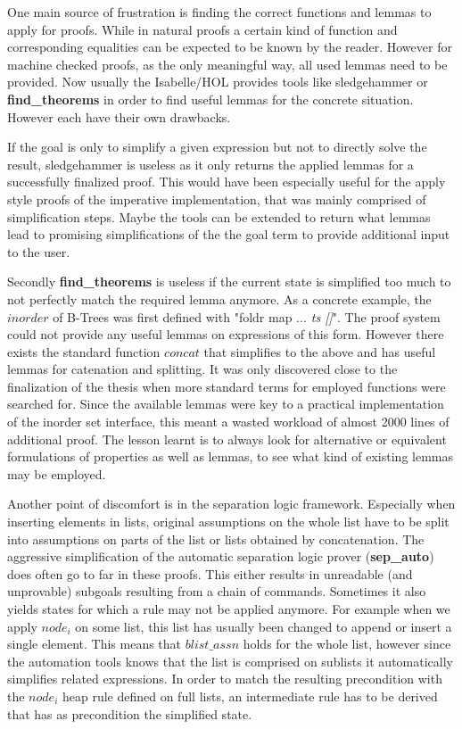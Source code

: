 One main source of frustration is finding the correct
functions and lemmas to apply for proofs.
While in natural proofs a certain kind of function and corresponding equalities can be
expected to be known by the reader.
However for machine checked proofs, as the only meaningful way,
all used lemmas need to be provided.
Now usually the Isabelle/HOL provides tools like sledgehammer
or \textbf{find\_theorems} in order to find useful lemmas for the concrete situation.
However each have their own drawbacks.

If the goal is only to simplify a given expression but not to
directly solve the result, sledgehammer is useless
as it only returns the applied lemmas for a successfully finalized proof.
This would have been especially useful for the apply style proofs of the
imperative implementation, that was mainly comprised of simplification steps.
Maybe the tools can be extended to return what lemmas lead to promising
simplifications of the the goal term to provide additional input to the user.

Secondly \textbf{find\_theorems} is useless if the current state
is simplified too much to not perfectly match the required lemma anymore.
As a concrete example, the $inorder$ of B-Trees was first defined
with "foldr map \textit{$\dots$ ts []}".
The proof system could not provide any useful lemmas on expressions of this form.
However there exists the standard function $concat$ that
simplifies to the above and has useful lemmas for catenation
and splitting.
It was only discovered close to the finalization of the thesis
when more standard terms for employed functions were searched for.
Since the available lemmas were key to a practical
implementation of the inorder set interface,
this meant a wasted workload of almost 2000 lines of additional proof.
The lesson learnt is to always look for alternative or equivalent
formulations of properties as well as lemmas,
to see what kind of existing lemmas may be employed.

Another point of discomfort is in the separation logic framework.
Especially when inserting elements in lists,
original assumptions on the whole list have to be split
into assumptions on parts of the list or lists obtained by concatenation.
The aggressive simplification of the automatic
separation logic prover (\textbf{sep\_auto})
does often go to far in these proofs.
This either results in unreadable (and unprovable)
subgoals resulting from a chain of commands.
Sometimes it also yields states for which a rule
may not be applied anymore.
For example when we apply $node_i$ on some list,
this list has usually been changed to append or insert a single element.
This means that $blist\_assn$ holds for the whole list,
however since the automation tools knows that the list
is comprised on sublists it automatically simplifies related expressions.
In order to match the resulting precondition with the $node_i$ heap rule
defined on full lists, an intermediate rule has to be derived
that has as precondition the simplified state.


